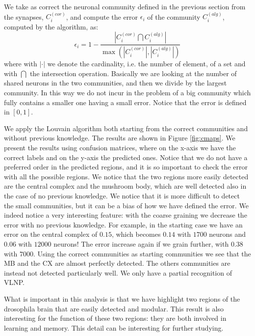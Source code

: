 We take as correct the neuronal community defined in the previous section from the synapses,
$C_i^{(cor)}$, and compute the error $\epsilon_i$ of the community $C_i^{(alg)}$, computed by
the algorithm, as:
\begin{equation} \label{eq:com_er}
    \epsilon_i = 1- \frac{\left|C_i^{(cor)} \bigcap C_i^{(alg)}\right| }{\max{\left(\left|C_i^{(cor)}\right|, \left|C_i^{(alg)}\right|\right)}}
\end{equation}
where with $|\cdot|$ we denote the cardinality, i.e. the number of element, of a set and with $\bigcap$
the intersection operation. Basically we are looking at the number of shared neurons in the two communities, 
and then we divide by the largest community. In this way we do not incur in the problem 
of a big community which fully contains a smaller one having a small error. 
Notice that the error is defined in $[0,1]$.

We apply the Louvain algorithm both starting from the correct communities and without previous knowledge.
The results are shown in Figure \ref{fig:cmaps}. We present the results
using confusion matrices, where on the x-axis we have the correct labels
and on the y-axis the predicted ones. Notice that we do not have a preferred
order in the predicted regions, and it is so important to check the error with
all the possible regions. We notice that the two regions more easily
detected are the central complex and the mushroom body, which are well
detected also in the case of no previous knowledge. We notice that it is 
more difficult to detect the small communities, but it can be a bias of
how we have defined the error. We indeed notice a very interesting feature: 
with the coarse graining we decrease the error with no previous knowledge. For example, 
in the starting case we have an error on the central complex of $0.15$, which
becomes $0.14$ with $1700$ neurons and $0.06$ with $12000$ neurons! The error
increase again if we grain further, with $0.38$ with $7000$. Using the correct 
communities as starting communities we see that the MB and the CX are almost
perfectly detected. The others communities are instead not detected 
particularly well. We only have a partial recognition of VLNP.

What is important in this analysis is that we have highlight two regions
of the drosophila brain that are easily detected and modular. This result
is also interesting for the function of these two regions: they are both
involved in learning and memory. This detail can be interesting for further
studying. 